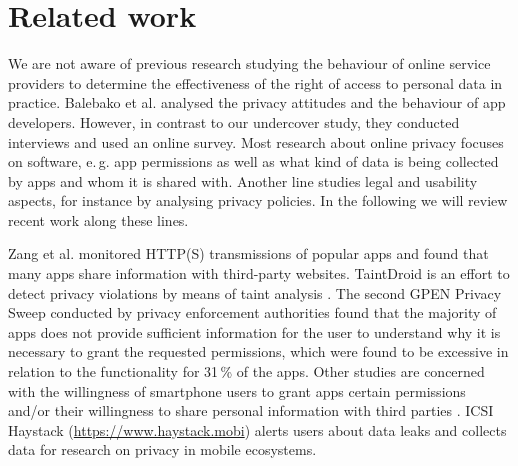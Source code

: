 \documentclass{llncs}
\begin{document}
\section{Related work}

We are not aware of previous research studying the behaviour of online service providers to determine the effectiveness of the right of access to personal data in practice. Balebako et al. \cite{Balebako14} analysed the privacy attitudes and the behaviour of app developers. However, in contrast to our undercover study, they conducted interviews and used an online survey.
Most research about online privacy focuses on software, e.\,g. app permissions as well as what kind of data is being collected by apps and whom it is shared with. Another line studies legal and usability aspects, for instance by analysing privacy policies. In the following we will review recent work along these lines.

Zang et al. \cite{Zang15} monitored HTTP(S) transmissions of popular apps and found that many apps share information with third-party websites. TaintDroid is an effort to detect privacy violations by means of taint analysis \cite{Enck10}.
The second GPEN Privacy Sweep \cite{PrivCA14} conducted by privacy enforcement authorities found that the majority of apps does not provide sufficient information for the user to understand why it is necessary to grant the requested permissions, which were found to be excessive in relation to the functionality for 31\,\% of the apps. Other studies are concerned with the willingness of smartphone users to grant apps certain permissions and/or their willingness to share personal information with third parties \cite{Lin12,Liu14}.
ICSI Haystack (\url{https://www.haystack.mobi}) alerts users about data leaks and collects data for research on privacy in mobile ecosystems.
\end{document}
